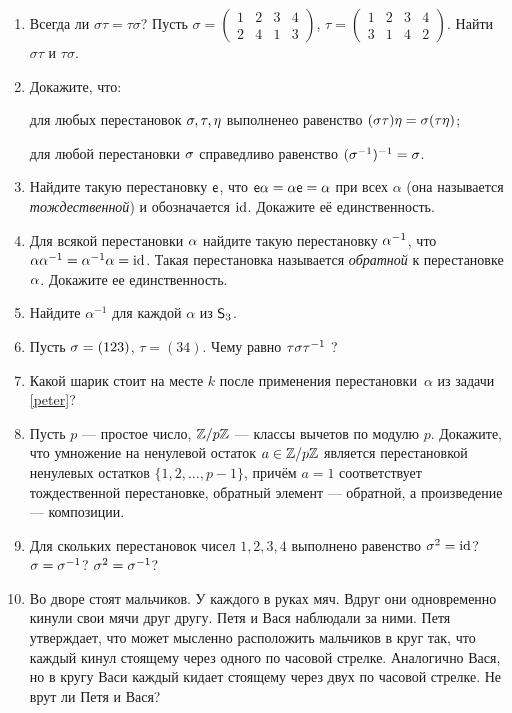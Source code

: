 \begin{enumerate}
\item \ipunkt
Всегда ли $\sigma\tau=\tau\sigma$?
\ipunkt
Пусть
$\sigma=\displaystyle\begin{pmatrix}1&2&3&4\\2&4&1&3\end{pmatrix}$,
$\tau=\displaystyle\begin{pmatrix}1&2&3&4\\3&1&4&2\end{pmatrix}$.
Найти $\sigma\tau$ и $\tau\sigma$.

\item Докажите, что:

\ipunkt для любых перестановок $\sigma,\tau,\eta$ выполненео равенство $(\sigma\tau)\eta = \sigma(\tau\eta)$;

\ipunkt для любой перестановки $\sigma$ справедливо равенство $(\sigma^{-1})^{-1}=\sigma$.

\item Найдите такую перестановку $\mathsf e$, что $\mathsf e\alpha=\alpha \mathsf e=\alpha$ при всех $\alpha$ (она называется {\it тождественной}) и обозначается $\mathrm{id}$. Докажите её единственность.

\item Для всякой перестановки $\alpha$ найдите такую перестановку $\alpha^{-1}$, что $\alpha\alpha^{-1}=\alpha^{-1}\alpha=\mathrm{id}$. Такая перестановка называется \textit{обратной} к перестановке $\alpha$. Докажите ее единственность.

\item Найдите $\alpha^{-1}$ для каждой $\alpha$ из ${\mathsf{S}}_3$.

\item Пусть $\sigma = (123)$, $\tau = (34)$. Чему равно $\tau\sigma\tau^{-1}$ ?


\item Какой шарик стоит на месте $k$ после применения перестановки~$\alpha$ из задачи \ref{peter}?

\item Пусть $p$ --- простое число, $\mathbb Z/p\mathbb Z$ --- классы вычетов по модулю $p$. Докажите, что
умножение на ненулевой остаток $a\in \mathbb Z/p\mathbb Z$ является перестановкой ненулевых остатков $\{1,2,\ldots,p-1\}$, причём $a=1$ соответствует тождественной перестановке, обратный элемент --- обратной, а произведение --- композиции.

\item Для скольких перестановок чисел $1, 2, 3, 4$ выполнено равенство
\ipunkt $\sigma^2 = \mathrm{id}$? \ipunkt $\sigma = \sigma^{-1}$? \ipunkt $\sigma^2 = \sigma^{-1}$?


\item \label{balls} Во дворе стоят   мальчиков. У каждого в руках мяч. Вдруг они одновременно кинули свои мячи друг другу. Петя и Вася наблюдали за ними. Петя утверждает, что может мысленно расположить мальчиков в круг так, что каждый кинул стоящему через одного по часовой стрелке. Аналогично Вася, но в кругу Васи каждый кидает стоящему через двух по часовой стрелке. Не врут ли Петя и Вася?

\end{enumerate}




